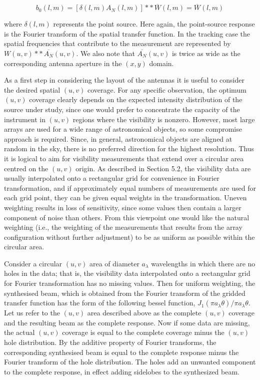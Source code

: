 \begin{equation}
\label{eq:mBeam}
b_0(l,m)=[\delta(l,m){A}_N(l,m)]\ast{\ast}{\,}\overline{W}(l,m) = \overline{W}(l,m)
\end{equation}

where $\delta(l,m)$ represents the point source. Here again, the point-source response is the Fourier transform of the spatial transfer function. In the tracking case the spatial frequencies that contribute to the measurement are represented by ${W}(u,v)\ast{\ast}{\,}\overline{A_N}(u,v) $. We also note that $\overline{A_N}(u,v)$ is twice as wide as the corresponding antenna aperture in the $(x,y)$ domain.

As a first step in considering the layout of the antennas it is useful to consider
the desired spatial $(u,v)$ coverage. For any specific observation,
the optimum $(u,v)$ coverage clearly depends on the expected intensity distribution of the source under study, since one would prefer to concentrate
the capacity of the instrument in $(u,v)$ regions where the visibility is nonzero. However, most large arrays are used for a wide range of astronomical objects, so some compromise approach is required. Since, in general, astronomical objects are aligned at random in the sky, there is no preferred direction for the highest resolution. Thus it is logical to aim for visibility measurements that extend over a circular area centred on the $(u,v)$ origin. As described in Section 5.2, the visibility data are usually interpolated onto a rectangular grid for convenience in Fourier transformation, and if approximately equal numbers of measurements are used for each grid point, they can be given equal weights in the transformation. Uneven weighting results in loss of sensitivity, since some values then contain a larger component of noise than others. From this viewpoint one would like the natural weighting (i.e., the weighting of the measurements that results from the array configuration without further adjustment) to be as uniform as possible within the circular area.

Consider a circular $(u,v)$ area of diameter $a_\lambda$ wavelengths in which there are no holes in the data; that is, the visibility data interpolated onto a rectangular grid for Fourier transformation has no missing values. Then for uniform weighting, the synthesised beam, which is obtained from the Fourier transform of the gridded transfer function has the form of the following bessel function, $J_1(\pi{a_\lambda{\theta}})/\pi{a_\lambda{\theta}}$. Let us refer to the $(u,v)$ area described above as the complete $(u,v)$ coverage and the resulting beam as the complete response. Now if some data are missing, the actual $(u,v)$ coverage is equal to the complete coverage minus the $(u,v)$ hole distribution. By the additive property of Fourier transforms, the corresponding synthesised beam is equal to the complete response minus the Fourier transform of the hole distribution. The holes add an unwanted component to the complete response, in effect adding sidelobes to the synthesized beam.\\


